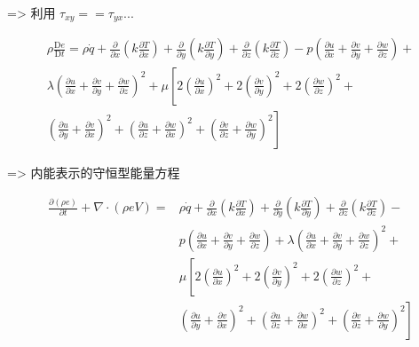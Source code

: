 \documentclass[UTF8]{ctexart}
\begin{document}
=> 利用 $\tau_{xy} == \tau_{yx} ...$


$$
	\begin{gathered}
		\rho \frac{\mathrm{D} e}{\mathrm{D} t}=\rho \dot{q}+\frac{\partial}{\partial x}\left(k \frac{\partial T}{\partial x}\right)+\frac{\partial}{\partial y}\left(k \frac{\partial T}{\partial y}\right)+\frac{\partial}{\partial z}\left(k \frac{\partial T}{\partial z}\right)-p\left(\frac{\partial u}{\partial x}+\frac{\partial v}{\partial y}+\frac{\partial w}{\partial z}\right)+ \\
		\lambda\left(\frac{\partial u}{\partial x}+\frac{\partial v}{\partial y}+\frac{\partial w}{\partial z}\right)^{2}+\mu\left[2\left(\frac{\partial u}{\partial x}\right)^{2}+2\left(\frac{\partial v}{\partial y}\right)^{2}+2\left(\frac{\partial w}{\partial z}\right)^{2}+\right. \\
			\left.\left(\frac{\partial u}{\partial y}+\frac{\partial v}{\partial x}\right)^{2}+\left(\frac{\partial u}{\partial z}+\frac{\partial w}{\partial x}\right)^{2}+\left(\frac{\partial v}{\partial z}+\frac{\partial w}{\partial y}\right)^{2}\right]
	\end{gathered}
$$


=> 内能表示的守恒型能量方程

$$
	\begin{aligned}
		\frac{\partial(\rho e)}{\partial t}+\nabla \cdot(\rho e V)= & \rho \dot{q}+\frac{\partial}{\partial x}\left(k \frac{\partial T}{\partial x}\right)+\frac{\partial}{\partial y}\left(k \frac{\partial T}{\partial y}\right)+\frac{\partial}{\partial z}\left(k \frac{\partial T}{\partial z}\right)-               \\
		                                                            & p\left(\frac{\partial u}{\partial x}+\frac{\partial v}{\partial y}+\frac{\partial w}{\partial z}\right)+\lambda\left(\frac{\partial u}{\partial x}+\frac{\partial v}{\partial y}+\frac{\partial w}{\partial z}\right)^{2}+                          \\
		                                                            & \mu\left[2\left(\frac{\partial u}{\partial x}\right)^{2}+2\left(\frac{\partial v}{\partial y}\right)^{2}+2\left(\frac{\partial w}{\partial z}\right)^{2}+\right.                                                                                    \\
		                                                            & \left.\left(\frac{\partial u}{\partial y}+\frac{\partial v}{\partial x}\right)^{2}+\left(\frac{\partial u}{\partial z}+\frac{\partial w}{\partial x}\right)^{2}+\left(\frac{\partial v}{\partial z}+\frac{\partial w}{\partial y}\right)^{2}\right]
	\end{aligned}
$$
\end{document}
